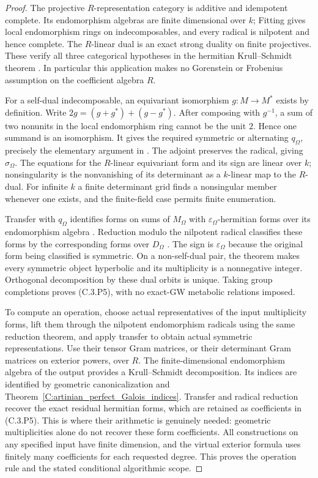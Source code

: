 \begin{proof}
The projective $R$-representation category is additive and
idempotent complete. Its endomorphism algebras are finite
dimensional over $k$; Fitting gives local endomorphism rings
on indecomposables, and every radical is nilpotent and hence
complete. The $R$-linear dual is an exact strong duality on
finite projectives. These verify all three categorical
hypotheses in the hermitian Krull--Schmidt theorem
\cite[Theorems 3.2--3.3, pp.272--273]{C-QSS1979}.
In particular this application makes no Gorenstein or
Frobenius assumption on the coefficient algebra $R$.

For a self-dual indecomposable, an equivariant
isomorphism $g:M\to M^*$ exists by definition.
Write $2g=(g+g^*)+(g-g^*)$.
After composing with $g^{-1}$, a sum of two nonunits in the
local endomorphism ring cannot be the unit $2$.
Hence one summand is an isomorphism. It gives the required
symmetric or alternating $q_\Omega$, precisely the elementary
argument in \cite[Proposition 2.5(1), p.271]{C-QSS1979}.
The adjoint preserves the radical, giving $\sigma_\Omega$.
The equations for the $R$-linear equivariant form and its sign
are linear over $k$; nonsingularity is the nonvanishing of
its determinant as a $k$-linear map to the $R$-dual.
For infinite $k$ a finite determinant grid finds a nonsingular
member whenever one exists, and the finite-field case permits
finite enumeration.

Transfer with $q_\Omega$ identifies forms on sums of
$M_\Omega$ with $\varepsilon_\Omega$-hermitian forms over
its endomorphism algebra
\cite[Proposition 2.4, p.271]{C-QSS1979}.
Reduction modulo the nilpotent radical classifies these forms
by the corresponding forms over $D_\Omega$
\cite[Theorem 2.2 and Corollary 2.3, pp.269--270]{C-QSS1979}.
The sign is $\varepsilon_\Omega$ because the original form
being classified is symmetric. On a non-self-dual pair,
the theorem makes every symmetric object hyperbolic and
its multiplicity is a nonnegative integer.
Orthogonal decomposition by these dual orbits is unique.
Taking group completions proves (C.3.P5), with no exact-GW
metabolic relations imposed.

To compute an operation, choose actual representatives of
the input multiplicity forms, lift them through the nilpotent
endomorphism radicals using the same reduction theorem, and
apply transfer to obtain actual symmetric representations.
Use their tensor Gram matrices, or their determinant Gram
matrices on exterior powers, over $R$.
The finite-dimensional endomorphism algebra of the output
provides a Krull--Schmidt decomposition. Its indices are
identified by geometric canonicalization and
Theorem~\ref{C:artinian_perfect_Galois_indices}.
Transfer and radical reduction recover the exact residual
hermitian forms, which are retained as coefficients in (C.3.P5).
This is where their arithmetic is genuinely needed: geometric
multiplicities alone do not recover these form coefficients.
All constructions on any specified input have finite
dimension, and the virtual exterior formula uses finitely
many coefficients for each requested degree. This proves
the operation rule and the stated conditional algorithmic scope.
\end{proof}

